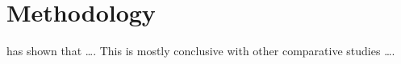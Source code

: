 \chapter{Methodology}
\label{ch:methodology}

\textcite{Fama1970} has shown that \ldots.
This is mostly conclusive with other comparative studies \ldots \parencite{Heck2026}.
